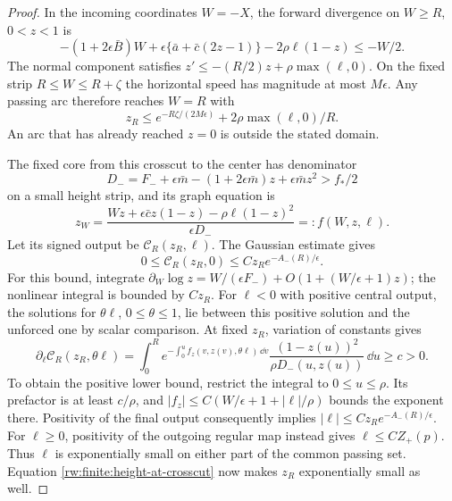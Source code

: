 \begin{proof}
In the incoming coordinates $W=-X$, the forward divergence on
$W\ge R$, $0<z<1$ is
\[
 -(1+2\epsilon\bar B)W
 +\epsilon\{\bar a+\bar c(2z-1)\}
                      -2\rho\ell(1-z)\le-W/2.
\]
The normal component satisfies
$z'\le-(R/2)z+\rho\max(\ell,0)$.
On the fixed strip $R\le W\le R+\zeta$ the horizontal speed
has magnitude at most $M\epsilon$. Any passing arc therefore
reaches $W=R$ with
\begin{equation}\label{rw:finite:height-at-crosscut}
 z_R\le e^{-R\zeta/(2M\epsilon)}
                          +2\rho\max(\ell,0)/R.
\end{equation}
An arc that has already reached $z=0$ is outside the stated domain.

The fixed core from this crosscut to the center has denominator
\[
 D_-=F_-+\epsilon\bar m-(1+2\epsilon\bar m)z
                                      +\epsilon\bar m z^2>f_*/2
\]
on a small height strip, and its graph equation is
\[
 z_W=\frac{Wz+\epsilon\bar c z(1-z)-\rho\ell(1-z)^2}
                  {\epsilon D_-}=:f(W,z,\ell).
\]
Let its signed output be $\mathcal C_R(z_R,\ell)$.
The Gaussian estimate gives
\[
 0\le\mathcal C_R(z_R,0)\le Cz_Re^{-A_-(R)/\epsilon}.
\]
For this bound, integrate
$\partial_W\log z=W/(\epsilon F_-)+O(1+(W/\epsilon+1)z)$;
the nonlinear integral is bounded by $Cz_R$.
For $\ell<0$ with positive central output, the solutions for
$\theta\ell$, $0\le\theta\le1$, lie between this positive
solution and the unforced one by scalar comparison. At fixed $z_R$,
variation of constants gives
\[
 \partial_\ell\mathcal C_R(z_R,\theta\ell)
 =\int_0^R e^{-\int_0^u f_z(v,z(v),\theta\ell)\,\dd v}
       \frac{(1-z(u))^2}{\rho D_-(u,z(u))}\,\dd u\ge c>0.
\]
To obtain the positive lower bound, restrict the integral to
$0\le u\le\rho$. Its prefactor is at least $c/\rho$, and
$|f_z|\le C(W/\epsilon+1+|\ell|/\rho)$ bounds the exponent
there. Positivity of the final output consequently implies
$|\ell|\le Cz_Re^{-A_-(R)/\epsilon}$.
For $\ell\ge0$, positivity of the outgoing regular map instead
gives $\ell\le CZ_+(p)$. Thus $\ell$ is exponentially small
on either part of the common passing set. Equation
\eqref{rw:finite:height-at-crosscut} now makes $z_R$ exponentially
small as well.


\end{proof}
